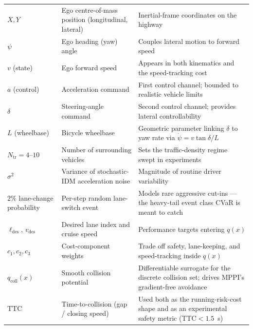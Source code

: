 \documentclass[letterpaper, 10 pt, conference]{ieeeconf}  %
\begin{document}
\begin{longtable}{|>{\raggedright\arraybackslash}p{}|>{\raggedright\arraybackslash}p{}|>{\raggedright\arraybackslash}p{}|}
\hline
\multicolumn{3}{|l|}{\textit{Working-example (vehicle and environment) quantities}} \\
\hline
$X,Y$ & Ego centre-of-mass position (longitudinal, lateral) & Inertial-frame coordinates on the highway \\
\hline
$\psi$ & Ego heading (yaw) angle & Couples lateral motion to forward speed \\
\hline
$v$ (state) & Ego forward speed & Appears in both kinematics and the speed-tracking cost \\
\hline
$a$ (control) & Acceleration command & First control channel; bounded to realistic vehicle limits \\
\hline
$\delta$ & Steering-angle command & Second control channel; provides lateral controllability \\
\hline
$L$ (wheelbase) & Bicycle wheelbase & Geometric parameter linking $\delta$ to yaw rate via $\dot{\psi}\!=\!v\tan\delta/L$ \\
\hline
$N_{\mathrm{tr}}\!=\!4\text{--}10$ & Number of surrounding vehicles & Sets the traffic-density regime swept in experiments \\
\hline
$\sigma^{2}$ & Variance of stochastic-IDM acceleration noise & Magnitude of routine driver variability \\
\hline
$2\%$ lane-change probability & Per-step random lane-switch event & Models rare aggressive cut-ins --- the heavy-tail event class CVaR is meant to catch \\
\hline
$\ell_{\mathrm{des}},\,v_{\mathrm{des}}$ & Desired lane index and cruise speed & Performance targets entering $q(x)$ \\
\hline
$c_1,c_2,c_3$ & Cost-component weights & Trade off safety, lane-keeping, and speed-tracking inside $q(x)$ \\
\hline
$q_{\mathrm{coll}}(x)$ & Smooth collision potential & Differentiable surrogate for the discrete collision set; drives MPPI's gradient-free avoidance \\
\hline
TTC & Time-to-collision (gap / closing speed) & Used both as the running-risk-cost shape and as an experimental safety metric (TTC$<\!1.5$~s) \\
\hline
\end{longtable}
\end{document}

